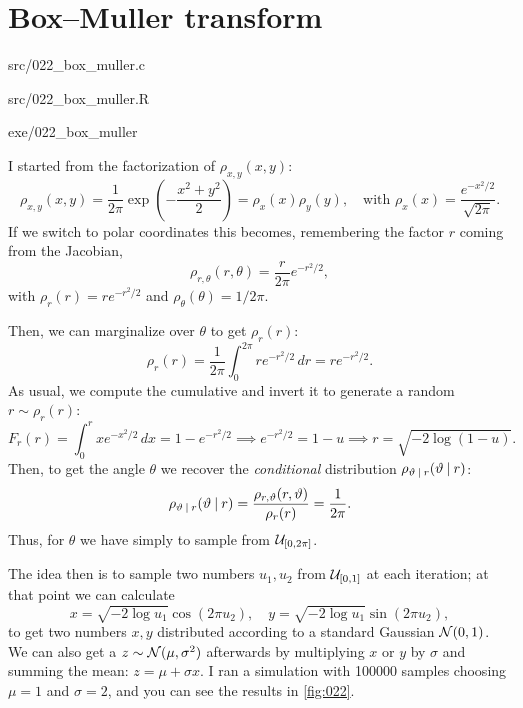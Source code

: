 \section{Box--Muller transform}\label{ex:022}

\begin{sourcefiles}
  \item[Source code] src/022\_box\_muller.c
  \item[Analysis script] src/022\_box\_muller.R
  \item[Executable] exe/022\_box\_muller
\end{sourcefiles} 

I started from the factorization of $\rho_{x, y}(x, y)$:
\begin{equation}
  \rho_{x, y}(x, y) = \frac{1}{2\pi} \exp\left(-\frac{x^{2} + y^{2}}{2}\right) =
  \rho_x(x) \rho_y(y), \quad \text{with } \rho_x(x) =
  \frac{e^{-x^{2}/2}}{\sqrt{2\pi}}.
\end{equation}
If we switch to polar coordinates this becomes, remembering the factor $r$
coming from the Jacobian,
\begin{equation}
  \rho_{r, \theta}(r, \theta) = \frac{r}{2\pi} e^{-r^{2}/2},
\end{equation}
with $\rho_r(r) = r e^{-r^{2}/2}$ and $\rho_\theta(\theta) = 1 / 2\pi$.

Then, we can marginalize over $\theta$ to get $\rho_r(r)$:
\begin{equation}
  \rho_r(r) = \frac{1}{2\pi} \int_{0}^{2\pi} r e^{-r^{2}/2} \, dr = r
  e^{-r^{2}/2}.
\end{equation}
As usual, we compute the cumulative and invert it to generate a random $r \sim
\rho_r(r)$:
\begin{equation}
  F_r(r) = \int_{0}^{r} x e^{-x^{2}/2} \, dx = 1 - e^{-r^{2}/2} \implies
  e^{-r^{2}/2} = 1 - u \implies r = \sqrt{-2 \log(1 - u)}.
\end{equation}
Then, to get the angle $\theta$ we recover the \emph{conditional} distribution
$\rho_{\vartheta\:\vert\: r}(\vartheta \:\vert\: r)$:
\begin{equation}
  \rho_{\vartheta\:\vert\: r}(\vartheta\:\vert\: r) = \frac{\rho_{r, \vartheta}(r,
  \vartheta)}{\rho_{r}(r)} = \frac{1}{2\pi}.
\end{equation}
Thus, for $\theta$ we have simply to sample from $\mathcal{U}_{[0, 2\pi]}$.

The idea then is to sample two numbers $u_{1}, u_{2}$ from $\mathcal{U}_{[0, 1]}$ at each
iteration; at that point we can calculate
\begin{equation}
  x = \sqrt{-2\log u_1} \cos(2\pi u_2), \quad y = \sqrt{-2\log u_1} \sin(2\pi
  u_2),
\end{equation}
to get two numbers $x, y$ distributed according to a standard Gaussian
$\mathcal{N}(0, 1)$. We can also get a $z \sim \mathcal{N}(\mu, \sigma^2)$ afterwards by
multiplying $x$ or $y$ by $\sigma$ and summing the mean: $z = \mu + \sigma x$. I
ran a simulation with \num{100000} samples choosing $\mu = 1$ and $\sigma = 2$,
and you can see the results in \cref{fig:022}.

